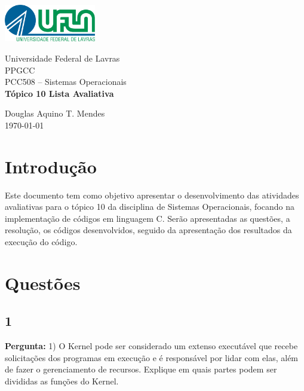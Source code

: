 \documentclass{article}
\begin{document}
\begin{titlepage}
    \centering
    \includegraphics[width=0.3\textwidth]{../../Topic1/Avaliativo/Imagens/Logo UFLA - Colorida chapada.png}

    \vspace*{2cm} %
    \Large
    Universidade Federal de Lavras\\
    PPGCC\\
    PCC508 – Sistemas Operacionais\\
    
    \vspace{2cm} %
    \huge %
    \textbf{Tópico 10 Lista Avaliativa}
    
    \vfill %
    
    \large
    Douglas Aquino T. Mendes\\
    \today %
\end{titlepage}

\tableofcontents
\newpage

\section{Introdução}
Este documento tem como objetivo apresentar o desenvolvimento das atividades avaliativas para o tópico 10 da disciplina de Sistemas Operacionais, focando na implementação de códigos em linguagem C. Serão apresentadas as questões, a resolução, os códigos desenvolvidos, seguido da apresentação dos resultados da execução do código.

\section{Questões}

\subsection{1}
\textbf{Pergunta:} 1) O Kernel pode ser considerado um extenso executável que recebe solicitações dos programas em execução e é responsável por lidar com elas, além de fazer o gerenciamento de recursos. Explique em quais partes podem ser divididas as funções do Kernel.\newline
\end{document}
